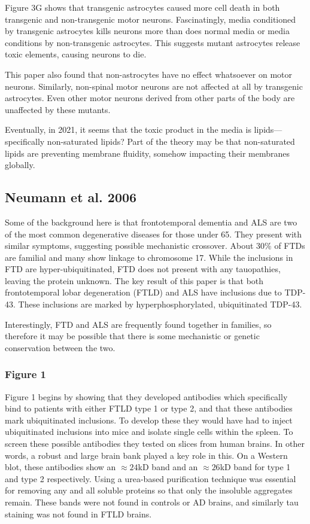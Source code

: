 \documentclass[12pt]{report}
\begin{document}
Figure 3G shows that transgenic astrocytes caused more cell death in both transgenic and non-transgenic motor neurons. Fascinatingly, media conditioned by transgenic astrocytes kills neurons more than does normal media or media conditions by non-transgenic astrocytes. This suggests mutant astrocytes release toxic elements, causing neurons to die.\newline

This paper also found that non-astrocytes have no effect whatsoever on motor neurons. Similarly, non-spinal motor neurons are not affected at all by transgenic astrocytes. Even other motor neurons derived from other parts of the body are unaffected by these mutants.\newline

Eventually, in 2021, it seems that the toxic product in the media is lipids---specifically non-saturated lipids? Part of the theory may be that non-saturated lipids are preventing membrane fluidity, somehow impacting their membranes globally. 


\subsection{Neumann et al. 2006}

Some of the background here is that frontotemporal dementia and ALS are two of the most common degenerative diseases for those under 65. They present with similar symptoms, suggesting possible mechanistic crossover. About 30\% of FTDs are familial and many show linkage to chromosome 17. While the inclusions in FTD are hyper-ubiquitinated, FTD does not present with any tauopathies, leaving the protein unknown. The key result of this paper is that both frontotemporal lobar degeneration (FTLD) and ALS have inclusions due to TDP-43. These inclusions are marked by hyperphosphorylated, ubiquitinated TDP-43.\newline

Interestingly, FTD and ALS are frequently found together in families, so therefore it may be possible that there is some mechanistic or genetic conservation between the two. 

\subsubsection{Figure 1}

Figure 1 begins by showing that they developed antibodies which specifically bind to patients with either FTLD type 1 or type 2, and that these antibodies mark ubiquitinated inclusions. To develop these they would have had to inject ubiquitinated inclusions into mice and isolate single cells within the spleen. To screen these possible antibodies they tested on slices from human brains. In other words, a robust and large brain bank played a key role in this. On a Western blot, these antibodies show an $\approx 24$kD band and an $\approx 26$kD band for type 1 and type 2 respectively. Using a urea-based purification technique was essential for removing any and all soluble proteins so that only the insoluble aggregates remain. These bands were not found in controls or AD brains, and similarly tau staining was not found in FTLD brains.\newline
\end{document}

